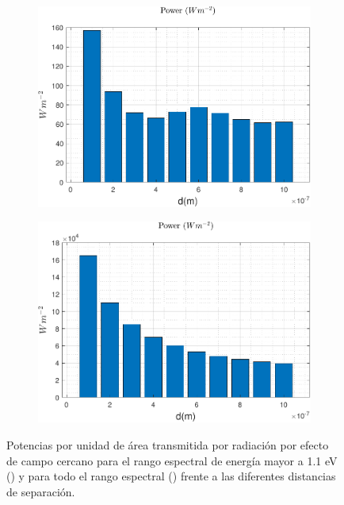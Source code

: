 \begin{figure}[H]
	\centering
		\begin{subfigure}[b]{0.49\textwidth}
	\centering
		\includegraphics[width=1.00\textwidth]{figuras/Resultados/radiacion/p_11_SiSi.pdf}
	\caption{ }
	\label{fig:prad_Eg11_SiSi}
\end{subfigure}
\hfill
\begin{subfigure}[b]{0.49\textwidth}
	\centering
		\includegraphics[width=1.00\textwidth]{figuras/Resultados/radiacion/p_full_SiSi.pdf}
	\caption{ }
	\label{fig:prad_full_SiSi}
\end{subfigure}
	\caption{Potencias por unidad de área transmitida por radiación por efecto de campo cercano para el rango espectral de energía mayor a 1.1 eV () y para todo el rango espectral () frente a las diferentes distancias de separación.}
	\label{fig:prad_SiSi}
\end{figure}
